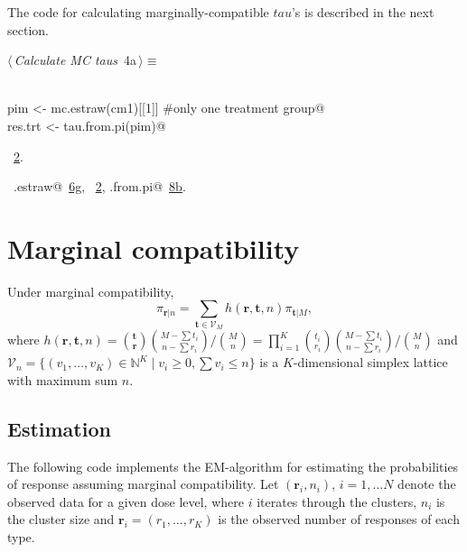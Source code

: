 \documentclass[reqno]{amsart}
\renewcommand{\NWtarget}[2]{\hypertarget{#1}{#2}}
\renewcommand{\NWlink}[2]{\hyperlink{#1}{#2}}
\newcommand{\rvec}{\mathbf{r}}
\newcommand{\tvec}{\mathbf{t}}
\newcommand{\V}{\mathcal{V}}
\begin{document}
The code for calculating marginally-compatible $tau$'s is described in the next section.

\begin{flushleft} \small\label{scrap18}\raggedright\small
\NWtarget{nuweb4a}{} $\langle\,${\itshape Calculate MC taus}\nobreak\ {\footnotesize {4a}}$\,\rangle\equiv$
\vspace{-1ex}
\begin{list}{}{} \item
\mbox{}\verb@@\\
\mbox{}\verb@   pim <- mc.estraw(cm1)[[1]]  #only one treatment group@\\
\mbox{}\verb@   res.trt <- tau.from.pi(pim)@\\
\mbox{}\verb@@{\NWsep}
\end{list}
\vspace{-1.5ex}
\footnotesize
\begin{list}{}{\setlength{\itemsep}{-\parsep}\setlength{\itemindent}{-\leftmargin}}
\item \NWtxtMacroRefIn\ \NWlink{nuweb2}{2}.
\item \NWtxtIdentsUsed\nobreak\  \verb@mc.estraw@\nobreak\ \NWlink{nuweb6g}{6g}, \verb@tau@\nobreak\ \NWlink{nuweb2}{2}, \verb@tau.from.pi@\nobreak\ \NWlink{nuweb8b}{8b}.
\item{}
\end{list}
\vspace{4ex}
\end{flushleft}
\section{Marginal compatibility}

Under marginal compatibility,
\begin{equation}
\pi_{\rvec|n} = \sum_{\tvec \in \V_M} h(\rvec, \tvec, n) \pi_{\tvec|M},
\end{equation}
where $h(\rvec, \tvec, n)  = \binom{\tvec}{\rvec}\binom{M-\sum t_i}{n-\sum r_i} \big/ \binom{M}{n} = 
\prod_{i=1}^K \binom{t_i}{r_i}\binom{M-\sum t_i}{n-\sum r_i} \big/ \binom{M}{n}$ and
$\V_n=\{(v_1,\ldots,v_K)\in \mathbb{N}^K \mid v_i \geq 0, \sum v_i \leq n\}$ is a $K$-dimensional simplex lattice with maximum
sum $n$.

\subsection{Estimation}

The following code implements the EM-algorithm for estimating the probabilities
of response assuming marginal compatibility. Let $(\rvec_i, n_i)$, $i=1,\ldots N$ denote
the observed data for a given dose level, where $i$ iterates
through the clusters, $n_i$ is the cluster size and 
$\rvec_i = (r_1,\ldots,r_K)$ is the observed number of responses of each type.
\end{document}
